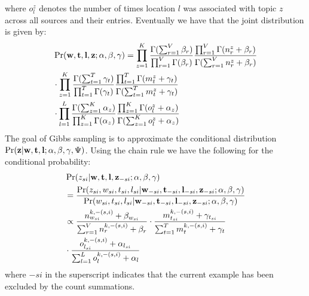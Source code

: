 \documentclass[twoside,leqno,twocolumn]{article}
\newcommand{\w}{{\bf w}}
\newcommand{\z}{{\bf z}}
\newcommand{\loc}{{\bf l}}
\newcommand{\tim}{{\bf t}}
\begin{document}
where $o^z_l$ denotes the number of times location $l$ was associated with topic $z$ across all sources and their entries. 
Eventually we have that the joint distribution is given by:
\begin{align}
&\Pr(\w,\tim,\loc,\z;\alpha,\beta,\gamma) = \prod_{z = 1}^K \frac{\Gamma(\sum_{r = 1}^V \beta_r)}{\prod_{r = 1}^V \Gamma(\beta_r)} \frac{\prod_{r = 1}^V \Gamma(n^{z}_{r} + \beta_r)}{\Gamma(\sum_{r =1}^V n^{z}_{r} + \beta_r)} \nonumber \\
&\cdot \prod_{z = 1}^K \frac{\Gamma(\sum_{t = 1}^T \gamma_t)}{\prod_{t = 1}^T \Gamma(\gamma_t)} \frac{\prod_{t = 1}^T \Gamma(m^{z}_{t} + \gamma_t)}{\Gamma(\sum_{t =1}^T m^{z}_{t} + \gamma_t)} \nonumber \\
& \cdot \prod_{l =1}^L\frac{\Gamma(\sum_{z = 1}^K \alpha_z)}{\prod_{z = 1}^K \Gamma(\alpha_z)}\frac{\prod_{z=1}^K\Gamma(o^z_l + \alpha_z)}{\Gamma(\sum_{z = 1}^K o^z_l + \alpha_z)}  \nonumber
\end{align}
The goal of Gibbs sampling is to approximate the conditional distribution $\Pr(\z | \w, \tim,\loc;\alpha,\beta,\gamma,\Psi)$. Using the chain rule we have the following for the conditional probability:
\begin{align}
&\Pr(z_{si}| \w,\tim,\loc,\z_{-si};\alpha,\beta,\gamma) \nonumber \\
&= \frac{\Pr(z_{si}, w_{si}, t_{si}, l_{si}|\w_{-si},\tim_{-si},\loc_{-si},\z_{-si};\alpha,\beta,\gamma)}{\Pr(w_{si}, t_{si}, l_{si}|\w_{-si},\tim_{-si},\loc_{-si},\z_{-si};\alpha,\beta,\gamma)} \nonumber \\
& \propto \frac{n^{k,-(s,i)}_{w_{si}} + \beta_{w_{si}}}{\sum_{r = 1}^V n^{k,-(s,i)}_{r} + \beta_{r}} \cdot \frac{m^{k,-(s,i)}_{t_{si}} + \gamma_{t_{si}}}{\sum_{t = 1}^T m^{k,-(s,i)}_{t} + \gamma_{t}} \nonumber \\
& \cdot \frac{o^{k,-(s,i)}_{l_{si}} + \alpha_{l_{si}}}{\sum_{l = 1}^L o^{k,-(s,i)}_{l} + \alpha_{l}} \nonumber
\end{align}
where $-si$ in the superscript indicates that the current example has been excluded by the count summations. 
\end{document}
